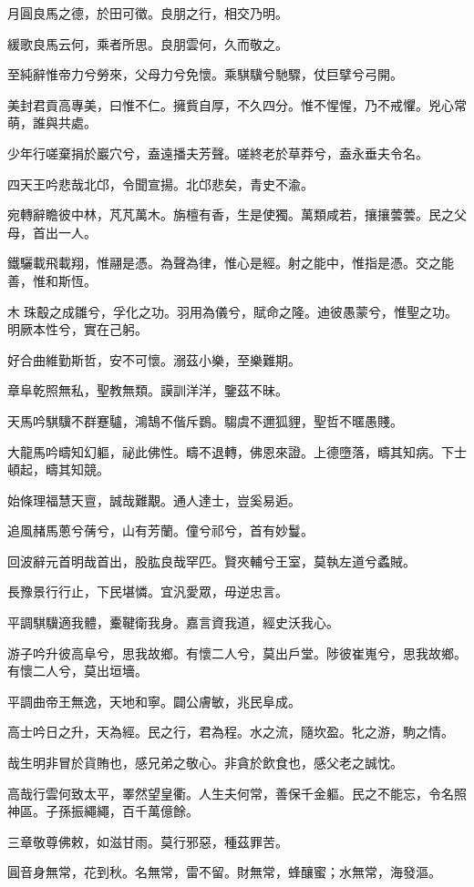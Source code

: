 \begin{pinyinscope}
月圓良馬之德，於田可徵。良朋之行，相交乃明。

緩歌良馬云何，乘者所思。良朋雲何，久而敬之。

至純辭惟帝力兮勞來，父母力兮免懷。乘騏驥兮馳驟，仗巨擘兮弓開。

美封君貢高專美，曰惟不仁。擁貲自厚，不久四分。惟不惺惺，乃不戒懼。兇心常萌，誰與共處。

少年行嗟棄捐於巖穴兮，盍遠播夫芳聲。嗟終老於草莽兮，盍永垂夫令名。

四天王吟悲哉北邙，令聞宣揚。北邙悲矣，青史不渝。

宛轉辭瞻彼中林，芃芃萬木。旃檀有香，生是使獨。萬類咸若，攘攘蕓蕓。民之父母，首出一人。

鐵驪載飛載翔，惟翮是憑。為聲為律，惟心是經。射之能中，惟指是憑。交之能善，惟和斯恆。

木珠鷇之成雛兮，孚化之功。羽用為儀兮，賦命之隆。迪彼愚蒙兮，惟聖之功。明厥本性兮，實在己躬。

好合曲維勤斯哲，安不可懷。溺茲小樂，至樂難期。

章阜乾照無私，聖教無類。謨訓洋洋，鑒茲不昧。

天馬吟騏驥不群蹇驢，鴻鵠不偕斥鷃。騶虞不邇狐貍，聖哲不暱愚賤。

大龍馬吟疇知幻軀，祕此佛性。疇不退轉，佛恩來證。上德墮落，疇其知病。下士頓起，疇其知競。

始條理福慧天亶，誠哉難覯。通人達士，豈奚易逅。

追風赭馬蔥兮蒨兮，山有芳蘭。僮兮祁兮，首有妙鬘。

回波辭元首明哉首出，股肱良哉罕匹。賢夾輔兮王室，莫執左道兮蟊賊。

長豫景行行止，下民堪憐。宜汎愛眾，毋逆忠言。

平調騏驥適我體，櫜鞬衛我身。嘉言資我道，經史沃我心。

游子吟升彼高阜兮，思我故鄉。有懷二人兮，莫出戶堂。陟彼崔嵬兮，思我故鄉。有懷二人兮，莫出垣墻。

平調曲帝王無逸，天地和寧。闢公膚敏，兆民阜成。

高士吟日之升，天為經。民之行，君為程。水之流，隨坎盈。牝之游，駒之情。

哉生明非冒於貨賄也，感兄弟之敬心。非貪於飲食也，感父老之誠忱。

高哉行雲何致太平，睪然望皇衢。人生夫何常，善保千金軀。民之不能忘，令名照神區。子孫振繩繩，百千萬億餘。

三章敬尊佛敕，如滋甘雨。莫行邪惡，種茲罪苦。

圓音身無常，花到秋。名無常，雷不留。財無常，蜂釀蜜；水無常，海發漚。


\end{pinyinscope}
